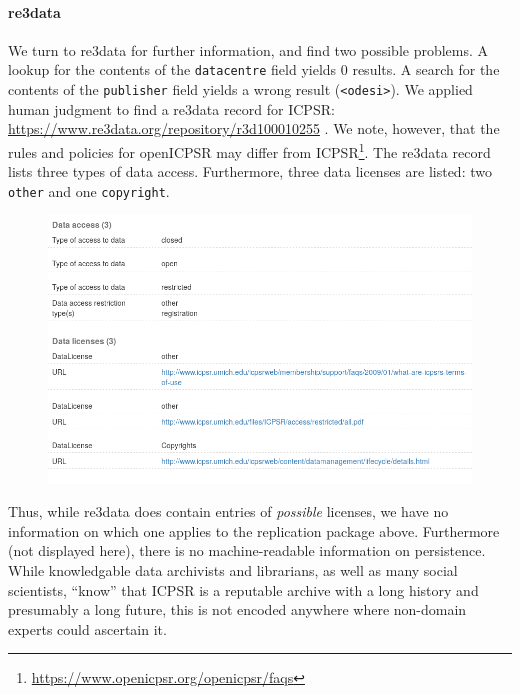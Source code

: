 \documentclass[10pt,letterpaper]{article}
\newcommand{\urlcite}[2]{#2\footnote{\url{#1}}}
\begin{document}
\paragraph{re3data}
We turn to re3data for further information, and find two possible problems. A lookup for the contents of the \texttt{datacentre} field yields 0 results. A search for the contents of the \texttt{publisher} field yields a wrong result (\lstinline|<odesi>|). We applied human judgment to find a re3data record for ICPSR: \url{https://www.re3data.org/repository/r3d100010255} \parencite{Re3data-icpsr}. We note, however, that the rules and policies for openICPSR may differ from \urlcite{https://www.openicpsr.org/openicpsr/faqs}{ICPSR}.
The re3data record lists three types of data access. Furthermore, three data licenses are listed: two \texttt{other} and one \texttt{copyright}.
\begin{figure}[H]
	\includegraphics[width=1\textwidth]{re3data-org-icpsr-access-licenses-20181008.png}
\end{figure}
Thus, while re3data does contain entries of \textit{possible} licenses, we have no information on which one applies to the replication package above. Furthermore (not displayed here), there is no machine-readable information on persistence. While knowledgable data archivists and librarians, as well as many social scientists, ``know'' that ICPSR is a reputable archive with a long history and presumably a long future, this is not encoded anywhere where non-domain experts could ascertain it.
\end{document}
